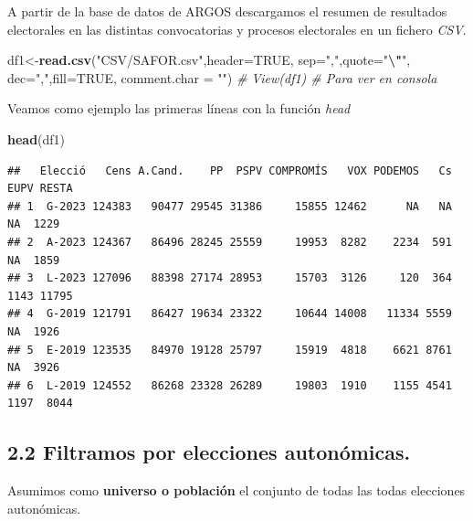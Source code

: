 \documentclass[
]{article}
\newenvironment{Shaded}{\begin{snugshade}}{\end{snugshade}}
\newcommand{\AttributeTok}[1]{\textcolor[rgb]{0.13,0.29,0.53}{#1}}
\newcommand{\CommentTok}[1]{\textcolor[rgb]{0.56,0.35,0.01}{\textit{#1}}}
\newcommand{\ConstantTok}[1]{\textcolor[rgb]{0.56,0.35,0.01}{#1}}
\newcommand{\FunctionTok}[1]{\textcolor[rgb]{0.13,0.29,0.53}{\textbf{#1}}}
\newcommand{\NormalTok}[1]{#1}
\newcommand{\OtherTok}[1]{\textcolor[rgb]{0.56,0.35,0.01}{#1}}
\newcommand{\SpecialCharTok}[1]{\textcolor[rgb]{0.81,0.36,0.00}{\textbf{#1}}}
\newcommand{\StringTok}[1]{\textcolor[rgb]{0.31,0.60,0.02}{#1}}
\begin{document}
A partir de la base de datos de ARGOS descargamos el resumen de
resultados electorales en las distintas convocatorias y procesos
electorales en un fichero \emph{CSV}.

\begin{Shaded}
\begin{Highlighting}[]
\NormalTok{  df1}\OtherTok{\textless{}{-}}\FunctionTok{read.csv}\NormalTok{(}\StringTok{"CSV/SAFOR.csv"}\NormalTok{,}\AttributeTok{header=}\ConstantTok{TRUE}\NormalTok{, }\AttributeTok{sep=}\StringTok{","}\NormalTok{,}\AttributeTok{quote=}\StringTok{"}\SpecialCharTok{\textbackslash{}"}\StringTok{\textquotesingle{}"}\NormalTok{, }\AttributeTok{dec=}\StringTok{","}\NormalTok{,}\AttributeTok{fill=}\ConstantTok{TRUE}\NormalTok{,}
                \AttributeTok{comment.char =} \StringTok{""}\NormalTok{)}
  \CommentTok{\# View(df1) \# Para ver en consola}
\end{Highlighting}
\end{Shaded}

Veamos como ejemplo las primeras líneas con la función \emph{head}

\begin{Shaded}
\begin{Highlighting}[]
\FunctionTok{head}\NormalTok{(df1)}
\end{Highlighting}
\end{Shaded}

\begin{verbatim}
##   Elecció   Cens A.Cand.    PP  PSPV COMPROMÍS   VOX PODEMOS   Cs EUPV RESTA
## 1  G-2023 124383   90477 29545 31386     15855 12462      NA   NA   NA  1229
## 2  A-2023 124367   86496 28245 25559     19953  8282    2234  591   NA  1859
## 3  L-2023 127096   88398 27174 28953     15703  3126     120  364 1143 11795
## 4  G-2019 121791   86427 19634 23322     10644 14008   11334 5559   NA  1926
## 5  E-2019 123535   84970 19128 25797     15919  4818    6621 8761   NA  3926
## 6  L-2019 124552   86268 23328 26289     19803  1910    1155 4541 1197  8044
\end{verbatim}

\hypertarget{filtramos-por-elecciones-autonuxf3micas.}{%
\subsection{2.2 Filtramos por elecciones
autonómicas.}\label{filtramos-por-elecciones-autonuxf3micas.}}

Asumimos como \textbf{universo o población} el conjunto de todas las
todas elecciones autonómicas.
\end{document}
